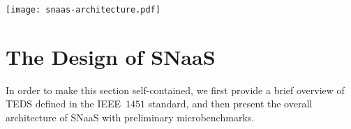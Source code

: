 \documentclass[conference]{IEEEtran}
\begin{document}
\begin{figure*}[p]
\begin{center}
\texttt{[image: snaas-architecture.pdf]}
\end{center}
\vspace{-5mm}
\caption{\textbf{SNaaS architecture and workflow.}}
\label{fig:snaas-architecture}
\end{figure*}

\section{The Design of SN\lowercase{aa}S}\label{sec:snaas}
In order to make this section self-contained, we first provide a brief overview of TEDS defined in the IEEE~$1451$ standard, and then present the overall architecture of SNaaS with preliminary microbenchmarks.
\end{document}

